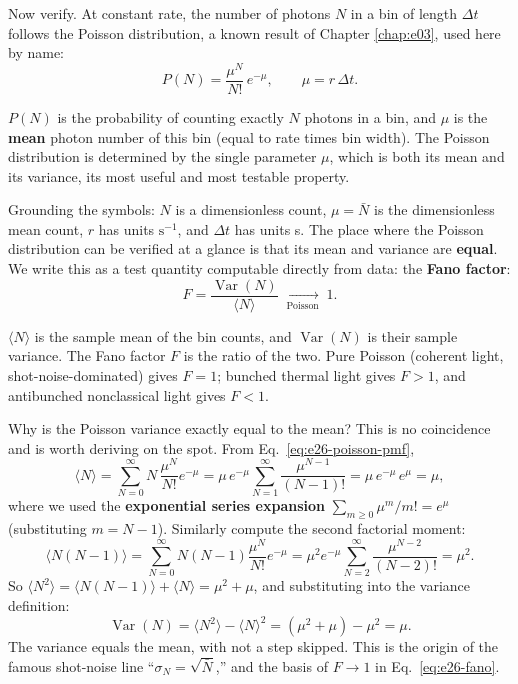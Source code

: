 Now verify. At constant rate, the number of photons \(N\) in a bin of length \(\Delta t\) follows the Poisson distribution, a known result of Chapter \ref{chap:e03}, used here by name:
\begin{equation}
  P(N)=\frac{\mu^{N}}{N!}\,e^{-\mu},\qquad \mu=r\,\Delta t .
  \label{eq:e26-poisson-pmf}
\end{equation}
\begin{formulaexplain}
\(P(N)\) is the probability of counting exactly \(N\) photons in a bin, and \(\mu\) is the \textbf{mean} photon number of this bin (equal to rate times bin width). The Poisson distribution is determined by the single parameter \(\mu\), which is both its mean and its variance, its most useful and most testable property.
\end{formulaexplain}
Grounding the symbols: \(N\) is a dimensionless count, \(\mu=\bar N\) is the dimensionless mean count, \(r\) has units \(\mathrm{s^{-1}}\), and \(\Delta t\) has units s. The place where the Poisson distribution can be verified at a glance is that its mean and variance are \textbf{equal}. We write this as a test quantity computable directly from data: the \textbf{Fano factor}:
\begin{equation}
  F=\frac{\operatorname{Var}(N)}{\langle N\rangle}\;\xrightarrow[\text{Poisson}]{}\;1 .
  \label{eq:e26-fano}
\end{equation}
\begin{formulaexplain}
\(\langle N\rangle\) is the sample mean of the bin counts, and \(\operatorname{Var}(N)\) is their sample variance. The Fano factor \(F\) is the ratio of the two. Pure Poisson (coherent light, shot-noise-dominated) gives \(F=1\); bunched thermal light gives \(F>1\), and antibunched nonclassical light gives \(F<1\).
\end{formulaexplain}
Why is the Poisson variance exactly equal to the mean? This is no coincidence and is worth deriving on the spot. From Eq.\ \eqref{eq:e26-poisson-pmf},
\[
  \langle N\rangle=\sum_{N=0}^{\infty}N\,\frac{\mu^N}{N!}e^{-\mu}
  =\mu\,e^{-\mu}\sum_{N=1}^{\infty}\frac{\mu^{N-1}}{(N-1)!}
  =\mu\,e^{-\mu}\,e^{\mu}=\mu,
\]
where we used the \textbf{exponential series expansion} \(\sum_{m\ge0}\mu^m/m!=e^{\mu}\) (substituting \(m=N-1\)). Similarly compute the second factorial moment:
\[
  \langle N(N-1)\rangle=\sum_{N=0}^{\infty}N(N-1)\frac{\mu^N}{N!}e^{-\mu}
  =\mu^2 e^{-\mu}\sum_{N=2}^{\infty}\frac{\mu^{N-2}}{(N-2)!}=\mu^2 .
\]
So \(\langle N^2\rangle=\langle N(N-1)\rangle+\langle N\rangle=\mu^2+\mu\), and substituting into the variance definition:
\[
  \operatorname{Var}(N)=\langle N^2\rangle-\langle N\rangle^2=(\mu^2+\mu)-\mu^2=\mu .
\]
The variance equals the mean, with not a step skipped. This is the origin of the famous shot-noise line ``\(\sigma_N=\sqrt{\bar N}\),'' and the basis of \(F\to1\) in Eq.\ \eqref{eq:e26-fano}.

